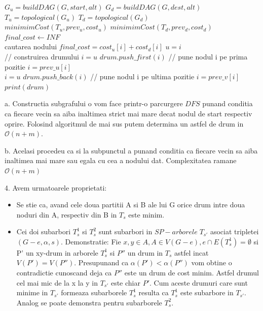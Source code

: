 \documentclass[11pt,leqno]{article}
\def\ClasaO{{\mathcal O}}
\begin{document}
\vspace{0.5cm}
\begin{algorithmic}
    \State $G_u = buildDAG(G, start, alt)$
    \State $G_d = buildDAG(G, dest, alt)$
    \\
    \State $T_u = topological(G_u)$
    \State $T_d = topological(G_d)$
    \\
    \State $minimimCost(T_u, prev_u, cost_u)$
    \State $minimimCost(T_d, prev_d, cost_d)$
    \\
    \State $final\_cost \gets INF$
    \\ cautarea nodului
                \State $final\_cost = cost_u[i] + cost_d[i]$
                \State $u = i$
            \EndIf
        \EndIf
    \EndFor
    \\// construirea drumului
    \State $i = u$
        \State $drum.push\_first(i)$ // pune nodul i pe prima pozitie
        \State $i = prev\_u[i]$
    \EndWhile
    \\
    \State $i = u$
        \State $drum.push\_back(i)$ // pune nodul i pe ultima pozitie
        \State $i = prev\_v[i]$
    \EndWhile 
    \\
    \State $print(drum)$

\end{algorithmic}

a. Constructia subgrafului o vom face printr-o parcurgere $DFS$ punand conditia ca fiecare vecin sa aiba inaltimea strict mai mare decat nodul de start respectiv oprire. Folosind algoritmul de mai sus
putem determina un astfel de drum in $\ClasaO(n + m)$.

b. Acelasi procedeu ca si la subpunctul a punand conditia ca fiecare vecin sa aiba inaltimea mai mare sau egala cu cea a nodului dat. Complexitatea ramane $\ClasaO(n + m)$

\vspace{0.5cm}

4. Avem urmatoarele proprietati:
\begin{itemize}
    \item Se stie ca, avand cele doua partitii A si B ale lui G orice drum intre doua noduri din A, respectiv din B in $T_s$ este minim.
    \item Cei doi subarbori $T_s^1$ si $T_s^2$ sunt subarbori in $SP-arborele \; T_{s'}$ asociat tripletei $(G - e, \alpha, s)$. 
    Demonstratie: Fie $x, y \in A, A \in V(G - e), e \cap E(T_s^1) = \emptyset$ si P' un xy-drum in arborele $T_s^1$ si $P''$ un drum in $T_s$ astfel incat $V(P')=V(P'')$. Presupunand ca $\alpha(P') < \alpha(P'')$ vom obtine o contradictie cunoscand deja ca $P''$ este un drum de cost minim. 
    Astfel drumul cel mai mic de la x la y in $T_{s'}$ este chiar $P'$. 
    Cum aceste drumuri care sunt minime in $T_{s'}$ formeaza subarborele $T_s^1$ resulta ca $T_s^1$ este subarbore in $T_{s'}$. Analog se poate demonstra pentru subarborele $T_s^2$.
\end{itemize}
\end{document}
